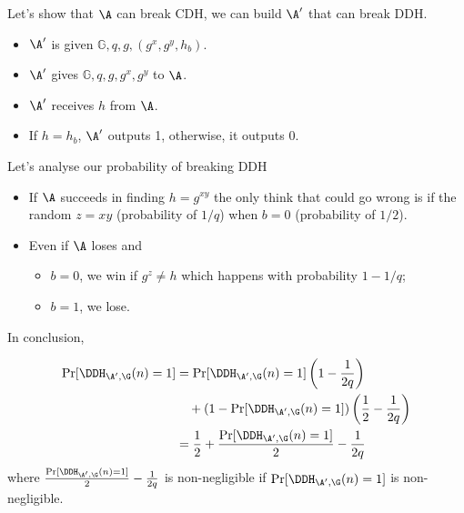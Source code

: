 \begin{solution}
	Let's show that $\A$ can break CDH, we can build $\A'$ that can break DDH.
	\begin{itemize}
		\item $\A'$ is given $\mathbb{G}, q, g, (g^x, g^y, h_b)$.
		\item $\A'$ gives $\mathbb{G}, q, g, g^x, g^y$ to $\A$.
		\item $\A'$ receives $h$ from $\A$.
		\item If $h = h_b$, $\A'$ outputs 1, otherwise, it outputs 0.
	\end{itemize}
	Let's analyse our probability of breaking DDH
	\begin{itemize}
		\item
		If $\A$ succeeds in finding $h = g^{xy}$ the only think that could go wrong
		is if the random $z = xy$ (probability of $1/q$) when $b = 0$ (probability of $1/2$).
		\item
		Even if $\A$ loses and
		\begin{itemize}
			\item $b = 0$, we win if $g^z \neq h$ which happens with probability $1-1/q$;
			\item $b = 1$, we lose.
		\end{itemize}
	\end{itemize}
	In conclusion,
	
	\begin{align*}
		\Pr[\DDH_{\A',\G}(n) = 1]
		& = \Pr[\DDH_{\A',\G}(n) = 1]\left(1 - \frac{1}{2q}\right)\\
		& \quad + (1 - \Pr[\DDH_{\A',\G}(n) = 1])\left(\frac{1}{2}-\frac{1}{2q}\right)\\
		& = \frac{1}{2} + \frac{\Pr[\DDH_{\A',\G}(n) = 1]}{2} - \frac{1}{2q}
	\end{align*}
	where $\frac{\Pr[\DDH_{\A',\G}(n) = 1]}{2} - \frac{1}{2q}$ is non-negligible if $\Pr[\DDH_{\A',\G}(n) = 1]$
	is non-negligible.
\end{solution}


